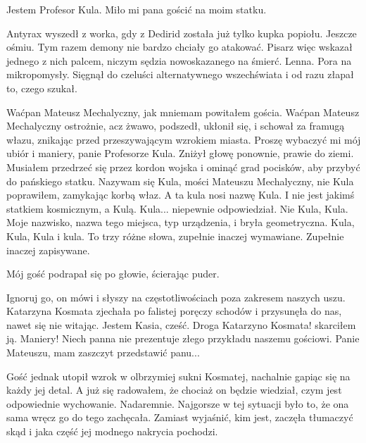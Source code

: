 \begin{dialogue}
\ds{} Jestem Profesor Kula. Miło mi pana gościć na moim statku.
\end{dialogue}

\divider{}

Antyrax wyszedł z worka, gdy z Dedirid została już tylko kupka popiołu.
Jeszcze ośmiu.
Tym razem demony nie bardzo chciały go atakować.
Pisarz więc wskazał jednego z nich palcem, niczym sędzia nowoskazanego na śmierć.
Lenna. Pora na mikropomysły.
Sięgnął do czeluści alternatywnego wszechświata i od razu złapał to, czego szukał.

\divider{}

\begin{dialogue}
\ds{} Waćpan Mateusz Mechalyczny, jak mniemam \dm{} powitałem gościa. Waćpan Mateusz Mechalyczny ostrożnie, acz żwawo, podszedł, ukłonił się, i schował za framugą włazu,
znikając przed przeszywającym wzrokiem miasta.
\ds{} Proszę wybaczyć mi mój ubiór i maniery, panie Profesorze Kula. \dm{} Zniżył głowę ponownie, prawie do ziemi. \dm{}
Musiałem przedrzeć się przez kordon wojska i ominąć grad pocisków, aby przybyć do pańskiego statku.
\ds{} Nazywam się Kula, mości Mateuszu Mechalyczny, nie Kula \dm{} poprawiłem, zamykając korbą właz. \dm{} A ta kula nosi nazwę Kula. 
I nie jest jakimś statkiem kosmicznym, a Kulą.
\ds{} Kula... \dm{} niepewnie odpowiedział.
\ds{} Nie Kula, Kula. Moje nazwisko, nazwa tego miejsca, typ urządzenia, i bryła geometryczna. Kula, Kula, Kula i kula. To trzy różne słowa, zupełnie inaczej wymawiane.
Zupełnie inaczej zapisywane.
\end{dialogue}

Mój gość podrapał się po głowie, ścierając puder.

\begin{dialogue}
\ds{} Ignoruj go, on mówi i słyszy na częstotliwościach poza zakresem naszych uszu. \dm{} Katarzyna Kosmata zjechała po falistej poręczy schodów i przysunęła do nas, nawet się nie witając.
\dm{} Jestem Kasia, cześć.
\ds{} Droga Katarzyno Kosmata! \dm{} skarciłem ją. \dm{} Maniery! Niech panna nie prezentuje złego przykładu naszemu gościowi. Panie Mateuszu, mam zaszczyt przedstawić panu...
\end{dialogue}

Gość jednak utopił wzrok w olbrzymiej sukni Kosmatej, nachalnie gapiąc się na każdy jej detal.
A już się radowałem, że chociaż on będzie wiedział, czym jest odpowiednie wychowanie. Nadaremnie.
Najgorsze w tej sytuacji było to, że ona sama wręcz go do tego zachęcała. 
Zamiast wyjaśnić, kim jest, zaczęła tłumaczyć skąd i jaka część jej modnego nakrycia pochodzi.

